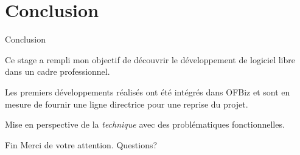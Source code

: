 \documentclass{beamer}
\begin{document}
\section*{Conclusion}

\begin{frame}{Conclusion}
  \begin{block}{}
    Ce stage a rempli mon objectif de découvrir le développement de
    logiciel libre dans un cadre professionnel.
  \end{block}

  \begin{block}{}
    Les premiers développements réalisés ont été intégrés dans OFBiz
    et sont en mesure de fournir une ligne directrice pour une reprise
    du projet.
  \end{block}

  \begin{block}{}
    Mise en perspective de la \emph{technique} avec des problématiques
    fonctionnelles.
  \end{block}
\end{frame}

\begin{frame}{Fin}
  Merci de votre attention. Questions?
\end{frame}
\end{document}
